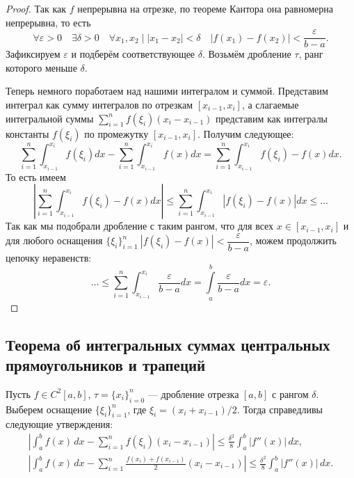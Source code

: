 \begin{proof}
	Так как \(f\) непрерывна на отрезке, по теореме Кантора она равномерна непрерывна, то есть \[
	\forall \varepsilon > 0 \quad \exists \delta > 0 \quad \forall x_1, x_2 \mid |x_1 - x_2| < \delta \quad |f(x_1) - f(x_2)| < \frac{\varepsilon}{b - a}.
	\]
	Зафиксируем \(\varepsilon\) и подберём соответствующее \(\delta\). Возьмём дробление \(\tau\), ранг которого меньше \(\delta\).
	
	Теперь немного поработаем над нашими интегралом и суммой. Представим интеграл как сумму интегралов по отрезкам \([x_{i - 1}, x_i]\), а слагаемые интегральной суммы \(\sum\limits_{i = 1}^n f(\xi_i) (x_i - x_{i - 1})\) представим как интегралы константы \(f(\xi_i)\) по промежутку \([x_{i - 1}, x_i]\). Получим следующее: \[
	\sum_{i = 1}^n \int_{x_{i - 1}}^{x_i} f(\xi_i) dx - \sum_{i = 1}^n \int_{x_{i - 1}}^{x_i} f(x) dx = \sum_{i = 1}^n \int_{x_{i - 1}}^{x_i} f(\xi_i) - f(x) dx.
	\]
	То есть имеем \[
	\left|\sum_{i = 1}^n \int_{x_{i - 1}}^{x_i} f(\xi_i) - f(x) dx \right| \leqslant \sum_{i = 1}^n \int_{x_{i - 1}}^{x_i} \left|f(\xi_i) - f(x) \right| dx \leqslant \ldots
	\]
	Так как мы подобрали дробление с таким рангом, что для всех \(x \in [x_{i - 1}, x_i]\) и для любого оснащения \(\{\xi_i\}_{i = 1}^n \ |f(\xi_i) - f(x)| < \dfrac{\varepsilon}{b - a}\), можем продолжить цепочку неравенств: \[
	\ldots \leqslant \sum_{i = 1}^n \int_{x_{i - 1}}^{x_i} \frac{\varepsilon}{b - a} dx = \int\limits_a^b \frac{\varepsilon}{b - a} dx = \varepsilon.
	\]
\end{proof}

\subsection{Теорема об интегральных суммах центральных прямоугольников и трапеций}

\hypertarget{trap}{}
\begin{theorem}
	Пусть \(f \in C^2 [a, b]\), \(\tau = \{x_i\}_{i = 0}^n\) --- дробление отрезка \([a, b]\) с рангом \(\delta\). Выберем оснащение \(\{\xi_i\}_{i = 1}^n\), где \(\xi_i = (x_i + x_{i - 1})/2\). Тогда справедливы следующие утверждения:
	\begin{gather}
		\label{intsum1}
		\left|\int_a^b f(x) \, dx - \sum_{i = 1}^n f(\xi_i) (x_i - x_{i - 1}) \right| \leqslant \frac{\delta^2}{8} \int_a^b |f''(x)| \, dx, \\
		\label{intsum2}
		\left|\int_a^b f(x) \, dx - \sum_{i = 1}^n \frac{f(x_i) + f(x_{i - 1})}{2} (x_i - x_{i - 1})\right| \leqslant \frac{\delta^2}{8} \int_a^b |f''(x)| \, dx.
	\end{gather}
\end{theorem}

